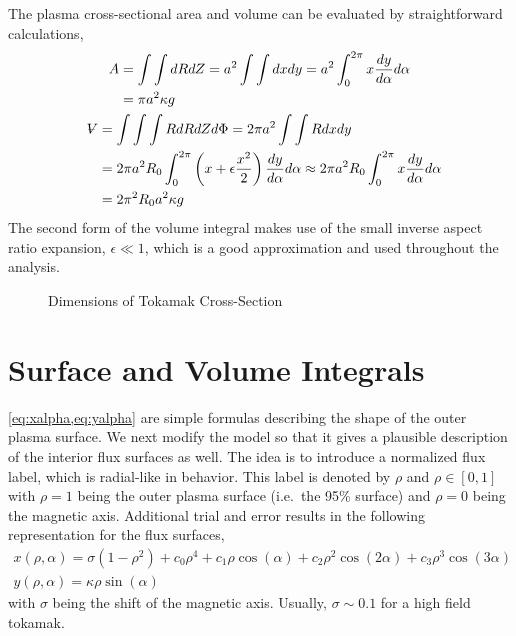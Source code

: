 The plasma cross-sectional area and volume can be evaluated by straightforward calculations,
\begin{gather}
\begin{split}
	A & = \int \int dR dZ = a^2 \int \int dx dy = a^2 \int_0^{2 \pi} x \frac{dy}{d\alpha} d\alpha \\ & = \pi a^2 \kappa g
\end{split} \\
\begin{split}
	\volume & = \int \int \int R dR dZ d\Phi = 2 \pi a^2 \int \int R dx dy \\ & = 2 \pi a^2 R_0 \int_0^{2 \pi} \left( x + \epsilon \frac{ x^2 }{ 2} \right) \frac{dy}{d\alpha} d\alpha \approx 2 \pi a^2 R_0 \int_0^{2 \pi} x \frac{dy}{d\alpha} d\alpha \\ & = 2 \pi^2 R_0 a^2 \kappa g
\end{split}
\end{gather}
The second form of the volume integral makes use of the small inverse aspect ratio expansion, $\epsilon \ll 1 $, which is a good approximation and used throughout the analysis.

\begin{figure}[b]
\centering
\begin{adjustbox}{width=0.6\textwidth}
  \large
  
\end{adjustbox}
\caption{Dimensions of Tokamak Cross-Section}
\label{fig:dims}
\end{figure}

\section{Surface and Volume Integrals}

\cref{eq:xalpha,eq:yalpha} are simple formulas describing the shape of the outer plasma surface. We next modify the model so that it gives a plausible description of the interior flux surfaces as well. The idea is to introduce a normalized flux label, which is radial-like in behavior. This label is denoted by $\rho$ and $\rho \in [0,1]$ with $\rho = 1$ being the outer plasma surface (i.e.\ the 95\% surface) and $\rho = 0$ being the magnetic axis. Additional trial and error results in the following representation for the flux surfaces,
\begin{gather}
	x(\rho,\alpha) = \sigma( 1 - \rho^2 ) + c_0 \rho^4 + c_1 \rho \cos(\alpha) + c_2 \rho^2 \cos(2\alpha) +
		c_3 \rho^3 \cos(3\alpha) \\
	y(\rho, \alpha) = \kappa \rho \sin(\alpha)
\end{gather}
with $\sigma$ being the shift of the magnetic axis. Usually, $\sigma \sim 0.1$ for a high field tokamak.

